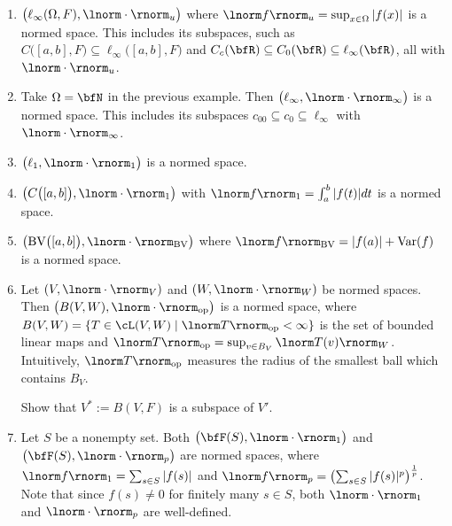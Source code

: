     \begin{center}
    \end{center}


    \begin{example}
        \phantom{a}
        \begin{enumerate}[label = (\arabic*),itemsep=1pt,topsep=3pt]
            \item $\bigl(\ell_\infty(\Omega,F), \lnorm \cdot \rnorm_u\bigr)$ where $\lnorm f \rnorm_u = \sup_{x \in \Omega}|f(x)|$ is a normed space. This includes its subspaces, such as $C \bigl([a,b],F\bigr) \subseteq \ell_\infty \bigl([a,b],F \bigr)$ and $C_c(\bfR) \subseteq C_0(\bfR) \subseteq \ell_\infty(\bfR)$, all with $\lnorm \cdot \rnorm_u$.
            \item Take $\Omega = \bfN$ in the previous example. Then $\bigl(\ell_\infty, \lnorm \cdot \rnorm_\infty\bigr)$ is a normed space. This includes its subspaces $c_{00} \subseteq c_0 \subseteq \ell_\infty$ with $\lnorm \cdot \rnorm_\infty$.
            \item $\bigl(\ell_1,\lnorm \cdot \rnorm_1\bigr)$ is a normed space.
            \item $\bigl(C\bigl([a,b]\bigr), \lnorm \cdot \rnorm_1\bigr)$ with $\lnorm f \rnorm_1 = \int_a^b |f(t)|dt$ is a normed space.
            \item $\bigl( \text{BV}\bigl([a,b]\bigr), \lnorm \cdot \rnorm_{\text{BV}}\bigr)$ where $\lnorm f \rnorm_{\text{BV}} = |f(a)| + \text{Var}(f)$ is a normed space.
            \item Let $(V,\lnorm \cdot \rnorm_V)$ and $(W,\lnorm \cdot \rnorm_W)$ be normed spaces. Then $\bigl(B(V,W),\lnorm \cdot \rnorm_\text{op}\bigr)$ is a normed space, where $B(V,W) = \{T \in \cL(V,W) \mid \lnorm T \rnorm_\text{op} < \infty\}$ is the set of bounded linear maps and $\lnorm T \rnorm_\text{op} = \sup_{v \in B_V}\lnorm T(v) \rnorm_W$. Intuitively, $\lnorm T \rnorm_\text{op}$ measures the radius of the smallest ball which contains $B_V$.
                \begin{exercise}
                    Show that $V^\ast := B(V,F)$ is a subspace of $V'$.
                \end{exercise}
            \item Let $S$ be a nonempty set. Both $\bigl( \bfF(S),\lnorm \cdot \rnorm_1\bigr)$ and $\bigl( \bfF(S),\lnorm \cdot \rnorm_p\bigr)$ are normed spaces, where $\lnorm f \rnorm_1 = \sum_{s \in S}|f(s)|$ and $\lnorm f \rnorm_p = \left( \sum_{s \in S}|f(s)|^p \right)^\frac{1}{p}$. Note that since $f(s) \neq 0$ for finitely many $s \in S$, both $\lnorm \cdot \rnorm_1$ and $\lnorm \cdot \rnorm_p$ are well-defined.

\end{enumerate}
\end{example}
